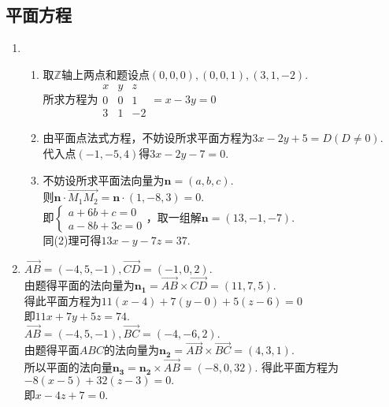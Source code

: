 \documentclass[UTF8]{ctexart}
\begin{document}
\subsection{平面方程}
\begin{enumerate}
\item \begin{enumerate}[(1)]
\item 取$\mathbb{Z}$轴上两点和题设点$\left(0,0,0\right),\left(0,0,1\right),\left(3,1,-2\right).$\\
所求方程为$\begin{array}{ccc}x&y&z\\0&0&1\\3&1&-2\end{array}=x-3y=0$
\item 由平面点法式方程，不妨设所求平面方程为$3x-2y+5=D\left(D\neq0\right).$\\
代入点$\left(-1,-5,4\right)$得$3x-2y-7=0.$
\item 不妨设所求平面法向量为$\mathbf{n}=\left(a,b,c\right).$\\
则$\mathbf{n}\cdot\overrightarrow{M_1M_2}=\mathbf{n}\cdot\left(1,-8,3\right)=0.$\\
即$\left\{\begin{array}{c}a+6b+c=0\\a-8b+3c=0\end{array}\right.$，取一组解$\mathbf{n}=\left(13,-1,-7\right).$\\
同(2)理可得$13x-y-7z=37.$\end{enumerate}

\item $\overrightarrow{AB}=\left(-4,5,-1\right),\overrightarrow{CD}=\left(-1,0,2\right).$\\
由题得平面的法向量为$\mathbf{n_1}=\overrightarrow{AB}\times\overrightarrow{CD}=\left(11,7,5\right).$\\
得此平面方程为$11\left(x-4\right)+7\left(y-0\right)+5\left(z-6\right)=0$\\
即$11x+7y+5z=74.$\\
$\overrightarrow{AB}=\left(-4,5,-1\right),\overrightarrow{BC}=\left(-4,-6,2\right).$\\
由题得平面$ABC$的法向量为$\mathbf{n_2}=\overrightarrow{AB}\times\overrightarrow{BC}=\left(4,3,1\right).$\\
所以平面的法向量$\mathbf{n_3}=\mathbf{n_2}\times\overrightarrow{AB}=\left(-8,0,32\right).$
得此平面方程为$-8\left(x-5\right)+32\left(z-3\right)=0.$\\
即$x-4z+7=0.$


\end{enumerate}
\end{document}
